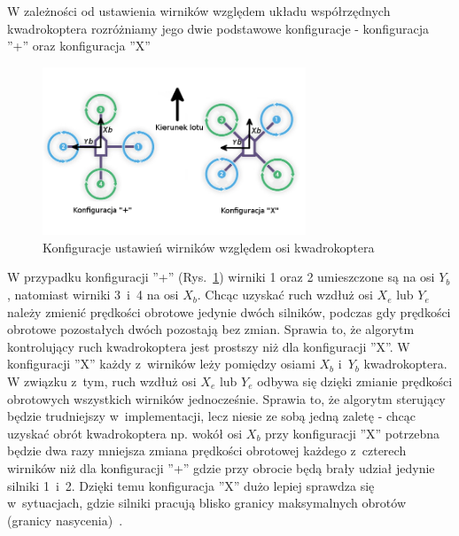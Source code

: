 W zależności od ustawienia wirników względem układu współrzędnych kwadrokoptera rozróżniamy jego dwie podstawowe konfiguracje - konfiguracja ''+''  oraz konfiguracja ''X''~\cite{quadro10, quadro11}

\begin{figure}[htbp]
	\centering
		\includegraphics[width=0.7\textwidth]{Pictures/quadrotor_configurations.png}
	\caption[Konfiguracje kwadrokopterów]{Konfiguracje ustawień wirników względem osi kwadrokoptera}
	\label{fig:quadrotor_configurations.png}
\end{figure}

W przypadku konfiguracji ''+'' (Rys.~\ref{fig:quadrotor_configurations.png}) wirniki 1 oraz 2 umieszczone są na osi $Y_b$, natomiast wirniki 3~i~4 na osi $X_b $. Chcąc uzyskać ruch wzdłuż osi $X_e$ lub $Y_e$ należy zmienić prędkości obrotowe jedynie dwóch silników, podczas gdy prędkości obrotowe pozostałych dwóch pozostają bez zmian. Sprawia to, że algorytm kontrolujący ruch kwadrokoptera jest prostszy niż dla konfiguracji ''X''. W konfiguracji ''X'' każdy z~wirników leży pomiędzy osiami $X_b$ i~$Y_b$ kwadrokoptera. W związku z~tym, ruch wzdłuż osi $X_e$ lub $Y_e$ odbywa się dzięki zmianie prędkości obrotowych wszystkich wirników jednocześnie. Sprawia to, że algorytm sterujący będzie trudniejszy w~implementacji, lecz niesie ze sobą jedną zaletę - chcąc uzyskać obrót kwadrokoptera np. wokół osi $X_b$ przy konfiguracji ''X'' potrzebna będzie dwa razy mniejsza zmiana prędkości obrotowej każdego z~czterech wirników niż dla konfiguracji ''+'' gdzie przy obrocie będą brały udział jedynie silniki 1~i~2. Dzięki temu konfiguracja ''X'' dużo lepiej sprawdza się w~sytuacjach, gdzie silniki pracują blisko granicy maksymalnych obrotów (granicy nasycenia)~\cite{quadro11}.

